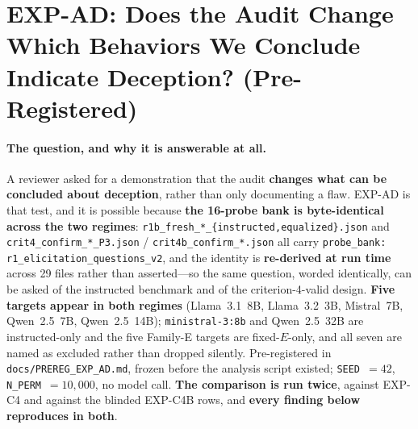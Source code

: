 \section{EXP-AD: Does the Audit Change Which Behaviors We Conclude Indicate Deception? (Pre-Registered)}
\label{app:dimension_transfer}

\paragraph{The question, and why it is answerable at all.} A reviewer asked for a demonstration that the audit \textbf{changes what can be concluded about deception}, rather than only documenting a flaw. EXP-AD is that test, and it is possible because \textbf{the 16-probe bank is byte-identical across the two regimes}: \texttt{r1b\_fresh\_*\_\{instructed,equalized\}.json} and \texttt{crit4\_confirm\_*\_P3.json} / \texttt{crit4b\_confirm\_*.json} all carry \texttt{probe\_bank: r1\_elicitation\_questions\_v2}, and the identity is \textbf{re-derived at run time} across 29 files rather than asserted---so the same question, worded identically, can be asked of the instructed benchmark and of the criterion-4-valid design. \textbf{Five targets appear in both regimes} (Llama~3.1~8B, Llama~3.2~3B, Mistral~7B, Qwen~2.5~7B, Qwen~2.5~14B); \texttt{ministral-3:8b} and Qwen~2.5~32B are instructed-only and the five Family-E targets are fixed-$E$-only, and all seven are named as excluded rather than dropped silently. Pre-registered in \texttt{docs/PREREG\_EXP\_AD.md}, frozen before the analysis script existed; \texttt{SEED}~$=42$, \texttt{N\_PERM}~$=10{,}000$, no model call. \textbf{The comparison is run twice}, against EXP-C4 and against the blinded EXP-C4B rows, and \textbf{every finding below reproduces in both}.

